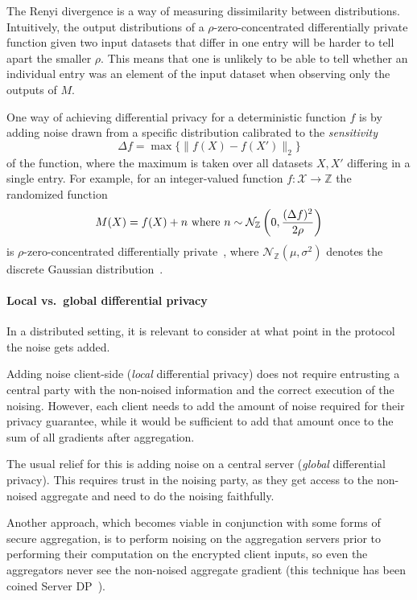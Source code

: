 \documentclass{article}
\begin{document}
The Renyi divergence is a way of measuring dissimilarity between distributions. Intuitively, the output distributions of a $\rho$-zero-concentrated differentially private function given two input datasets that differ in one entry will be harder to tell apart the smaller $\rho$. This means that one is unlikely to be able to tell whether an individual entry was an element of the input dataset when observing only the outputs of $M$.

One way of achieving differential privacy for a deterministic function $f$ is by adding noise drawn from a specific distribution calibrated to the \textit{sensitivity} 
$$\Delta f=\max\{\|f(X)-f(X')\|_2\}$$
of the function, where the maximum is taken over all datasets $X,X'$ differing in a single entry. For example, for an integer-valued function $f:\mathcal X\rightarrow \mathbb Z$ the randomized function
$$M(X) = f(X) + n \textnormal{ where } n \sim \mathcal N_\mathbb{Z}\left(0,\frac{(\Delta f)^2}{2\rho}\right)$$
is $\rho$-zero-concentrated differentially private~\cite[Proposition 1.6]{DBLP:journals/corr/abs-2004-00010}, where $\mathcal N_\mathbb{Z}(\mu, \sigma^2)$ denotes the discrete Gaussian distribution~\cite{DBLP:journals/corr/abs-2004-00010}.

\paragraph{Local vs.\ global differential privacy} In a distributed setting, it is relevant to consider at what point in the protocol the noise gets added.

Adding noise client-side (\textit{local} differential privacy) does not require entrusting a central party with the non-noised information and the correct execution of the noising. However, each client needs to add the amount of noise required for their privacy guarantee, while it would be sufficient to add that amount once to the sum of all gradients after aggregation.

The usual relief for this is adding noise on a central server (\textit{global} differential privacy). This requires trust in the noising party, as they get access to the non-noised aggregate and need to do the noising faithfully.

Another approach, which becomes viable in conjunction with some forms of secure aggregation, is
to perform noising on the aggregation servers prior to performing their computation on the encrypted
client inputs, so even the aggregators never see the non-noised aggregate gradient (this
technique has been coined Server DP~\cite{dprio}).
\end{document}
